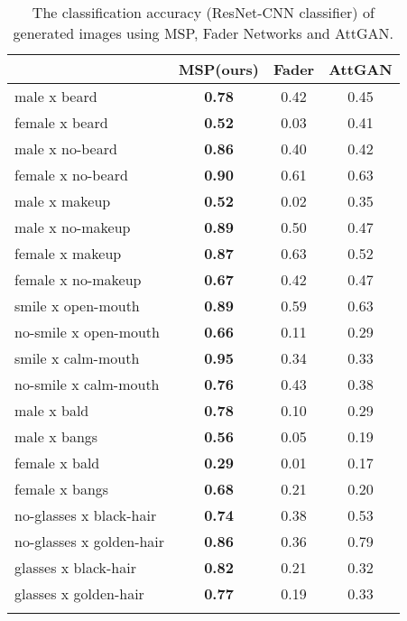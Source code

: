 \documentclass{article}
\begin{document}
\begin{table}[tb]
\centering \small
  \begin{tabular}{lccc}
    \Xhline{2.5\arrayrulewidth}
    & MSP(ours) & Fader & AttGAN  \\
    \hline
    male x beard	&\textbf{0.78}	&0.42	&0.45\\
female x beard	&\textbf{0.52}	&0.03	&0.41\\
male x no-beard	&\textbf{0.86}&	0.40	&0.42\\
female x no-beard&	\textbf{0.90}	&0.61&	0.63\\
male x makeup	&\textbf{0.52}	&0.02	&0.35\\
male x no-makeup	&\textbf{0.89}	&0.50	&0.47\\
female x makeup	&\textbf{0.87}	&0.63	&0.52\\
female x no-makeup	&\textbf{0.67}	&0.42	&0.47\\
smile x open-mouth	&\textbf{0.89}	&0.59	&0.63\\
no-smile x open-mouth	&\textbf{0.66}	&0.11	&0.29\\
smile x calm-mouth	&\textbf{0.95}	&0.34	&0.33\\
no-smile x calm-mouth	&\textbf{0.76}	&0.43	&0.38\\
male x bald	&\textbf{0.78}	&0.10	&0.29\\
male x bangs	&\textbf{0.56}	&0.05	&0.19\\
female x bald	&\textbf{0.29}	&0.01	&0.17\\
female x bangs	&\textbf{0.68}	&0.21	&0.20\\
no-glasses x black-hair	&\textbf{0.74}	&0.38	&0.53\\
no-glasses x golden-hair	&\textbf{0.86}	&0.36	&0.79\\
glasses x black-hair	&\textbf{0.82}	&0.21	&0.32\\
glasses x golden-hair	&\textbf{0.77}	&0.19	&0.33\\
    \Xhline{2.5\arrayrulewidth}
  \end{tabular}
\caption{The classification accuracy (ResNet-CNN classifier) of generated images using MSP, Fader Networks and AttGAN.}
  \label{T:cla_acc}
\end{table}
\end{document}
